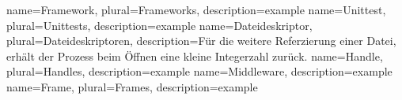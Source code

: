 \makeglossaries 

{
	name={Framework},  
	plural={Frameworks},
	description={example}
}  
{
	name={Unittest},  
	plural={Unittests},
	description={example}
}  
{
	name={Dateideskriptor},  
	plural={Dateideskriptoren},
	description={Für die weitere Referzierung einer Datei, erhält der Prozess beim Öffnen eine kleine Integerzahl zurück. \citep[S. 25]{beck1994linux}}
}  
{
	name={Handle},  
	plural={Handles},
	description={example}
} 
{
	name={Middleware},  
	description={example}
} 
{
	name={Frame},
	plural={Frames},  
	description={example}
} 